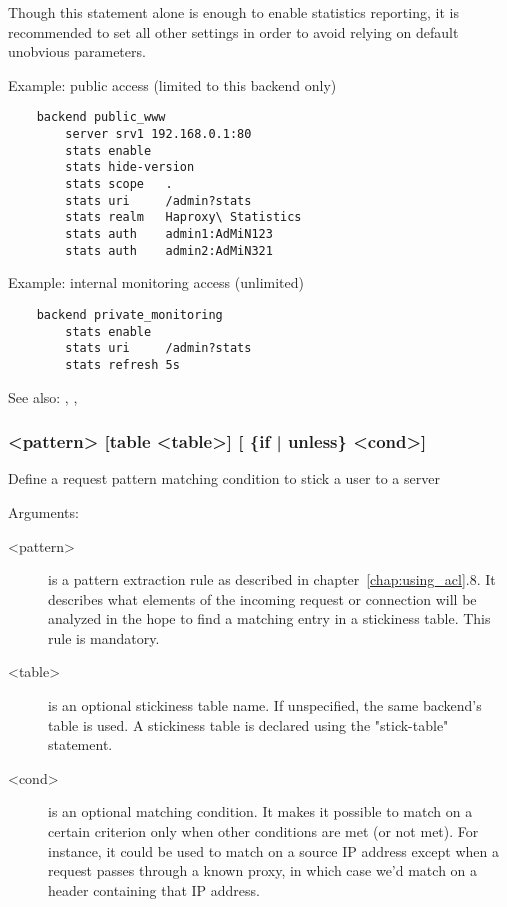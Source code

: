   Though this statement alone is enough to enable statistics reporting, it is
  recommended to set all other settings in order to avoid relying on default
  unobvious parameters.

  Example: public access (limited to this backend only)
  \begin{verbatim}
    backend public_www
        server srv1 192.168.0.1:80
        stats enable
        stats hide-version
        stats scope   .
        stats uri     /admin?stats
        stats realm   Haproxy\ Statistics
        stats auth    admin1:AdMiN123
        stats auth    admin2:AdMiN321
  \end{verbatim}

  Example: internal monitoring access (unlimited)
  \begin{verbatim}
    backend private_monitoring
        stats enable
        stats uri     /admin?stats
        stats refresh 5s
  \end{verbatim}


See also: , , 

\subsubsection[stick match]{ <pattern> [table <table>] [ \{if | unless\} <cond>]}

  Define a request pattern matching condition to stick a user to a server


  Arguments:
  \begin{description}
  \item[<pattern>] is a pattern extraction rule as described in chapter~\ref{chap:using_acl}.8. It
               describes what elements of the incoming request or connection
               will be analyzed in the hope to find a matching entry in a
               stickiness table. This rule is mandatory.

  \item[<table>] is an optional stickiness table name. If unspecified, the same
               backend's table is used. A stickiness table is declared using
               the "stick-table" statement.

  \item[<cond>] is an optional matching condition. It makes it possible to match
               on a certain criterion only when other conditions are met (or
               not met). For instance, it could be used to match on a source IP
               address except when a request passes through a known proxy, in
               which case we'd match on a header containing that IP address.
  \end{description}

